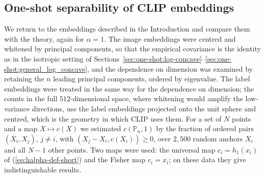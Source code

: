 
\subsection{One-shot separability of CLIP embeddings}\label{sec:clip-examples}

We return to the embeddings described in the Introduction and compare them with the theory, again for $\alpha=1$. The image embeddings were centred and whitened by principal components, so that the empirical covariance is the identity as in the isotropic setting of Sections~\ref{sec:one-shot:log-concave}--\ref{sec:one-shot:general_log_concave}, and the dependence on dimension was examined by retaining the $n$ leading principal components, ordered by eigenvalue. The label embeddings were treated in the same way for the dependence on dimension; the counts in the full $512$-dimensional space, where whitening would amplify the low-variance directions, use the label embeddings projected onto the unit sphere and centred, which is the geometry in which CLIP uses them. For a set of $N$ points and a map $X\mapsto c(X)$ we estimated $c({\mathbb P}_n,1)$ by the fraction of ordered pairs $(X_i,X_j)$, $j\neq i$, with $(X_j-X_i,c(X_i))\ge0$, over $2{,}500$ random anchors $X_i$ and all $N-1$ other points. Two maps were used: the universal map $c_i=h_1(x_i)$ of (\ref{eq:halpha-def-short}) and the Fisher map $c_i=x_i$; on these data they give indistinguishable results.

